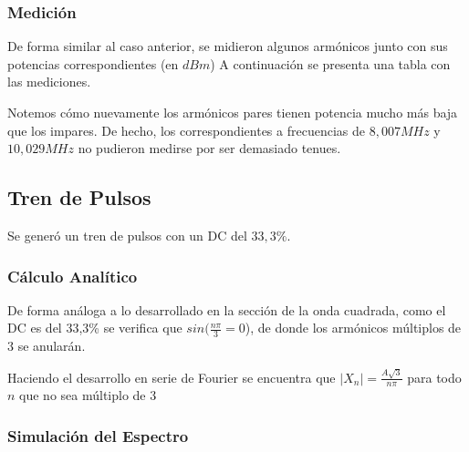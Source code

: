 \subsubsection{Medición}

De forma similar al caso anterior, se midieron algunos armónicos junto con sus potencias correspondientes (en $dBm$) A continuación se presenta una tabla con las mediciones.



\begin{table}[H]
\end{table}

Notemos cómo nuevamente los armónicos pares tienen potencia mucho más baja que los impares. De hecho, los correspondientes a frecuencias de $8,007 MHz$ y $10,029MHz$ no pudieron medirse por ser demasiado tenues.

\subsection{Tren de Pulsos}

Se generó un tren de pulsos con un DC del $33,3\%$. 

\subsubsection{Cálculo Analítico}

De forma análoga a lo desarrollado en la sección de la onda cuadrada, como el DC es del 33,3\% se verifica que $sin(\frac{n\pi}{3}=0$), de donde los armónicos múltiplos de $3$ se anularán. 

Haciendo el desarrollo en serie de Fourier se encuentra que $|X_n|=\frac{A\sqrt{3}}{n\pi}$ para todo $n$ que no sea múltiplo de $3$

\subsubsection{Simulación del Espectro}

